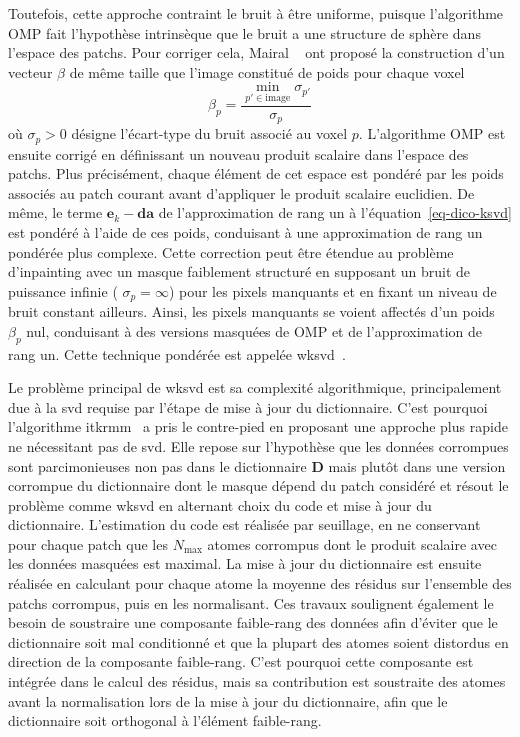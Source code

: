 Toutefois, cette approche contraint le bruit à être uniforme, puisque l'algorithme OMP fait l'hypothèse intrinsèque que le bruit a une structure de sphère dans l'espace des patchs. Pour corriger cela, Mairal \etal{}~\cite{mairal2008tip} ont proposé la construction d'un vecteur $\beta$ de même taille que l'image constitué de poids pour chaque voxel
\begin{equation}
    \beta_p = \frac{\min_{p'\in\text{image}}\sigma_{p'}}{\sigma_p}
\end{equation}
où $\sigma_p>0$ désigne l'écart-type du bruit associé au voxel $p$. L'algorithme OMP est ensuite corrigé en définissant un nouveau produit scalaire dans l'espace des patchs. Plus précisément, chaque élément de cet espace est pondéré par les poids associés au patch courant avant d'appliquer le produit scalaire euclidien. De même, le terme $\mathbf{e}_k-\mathbf{da}$ de l'approximation de rang un à l'équation~\eqref{eq-dico-ksvd} est pondéré à l'aide de ces poids, conduisant à une approximation de rang un pondérée plus complexe. 
%
Cette correction peut être étendue au problème d'inpainting avec un masque faiblement structuré en supposant un bruit de puissance infinie (\ie{} $\sigma_p=\infty$) pour les pixels manquants et en fixant un niveau de bruit constant ailleurs. Ainsi, les pixels manquants se voient affectés d'un poids $\beta_p$ nul, conduisant à des versions masquées de OMP et de l'approximation de rang un. Cette technique pondérée est appelée \gls{wksvd}~\cite{mairal2008tip}.

Le problème principal de \gls{wksvd} est sa complexité algorithmique, principalement due à la \gls{svd} requise par l'étape de mise à jour du dictionnaire. C'est pourquoi l'algorithme \gls{itkrmm}~\cite{naumova2018fast, naumova2017dictionary} a pris le contre-pied en proposant une approche plus rapide ne nécessitant pas de \gls{svd}. Elle repose sur l'hypothèse que les données corrompues sont parcimonieuses non pas dans le dictionnaire $\mathbf{D}$ mais plutôt dans une version corrompue du dictionnaire dont le masque dépend du patch considéré et résout le problème comme \gls{wksvd} en alternant choix du code et mise à jour du dictionnaire.
%
L'estimation du code est réalisée par seuillage, en ne conservant pour chaque patch que les $N_\mathrm{max}$ atomes corrompus dont le produit scalaire avec les données masquées est maximal. 
La mise à jour du dictionnaire est ensuite réalisée en calculant pour chaque atome la moyenne des résidus sur l'ensemble des patchs corrompus, puis en les normalisant. 
%
Ces travaux soulignent également le besoin de soustraire une composante faible-rang des données afin d'éviter que le dictionnaire soit mal conditionné et que la plupart des atomes soient distordus en direction de la composante faible-rang. C'est pourquoi cette composante est intégrée dans le calcul des résidus, mais sa contribution est soustraite des atomes avant la normalisation lors de la mise à jour du dictionnaire, afin que le dictionnaire soit orthogonal à l'élément faible-rang.

